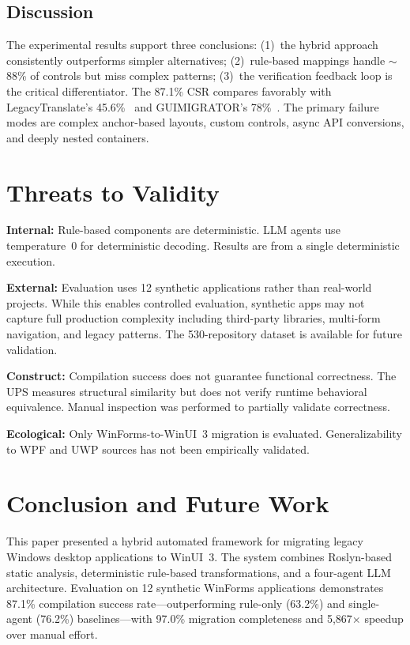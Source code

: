 \documentclass[conference]{IEEEtran}
\begin{document}
\subsection{Discussion}

The experimental results support three conclusions: (1)~the hybrid approach consistently outperforms simpler alternatives; (2)~rule-based mappings handle $\sim$88\% of controls but miss complex patterns; (3)~the verification feedback loop is the critical differentiator. The 87.1\% CSR compares favorably with LegacyTranslate's 45.6\%~\cite{moti2026} and GUIMIGRATOR's 78\%~\cite{gao2024}. The primary failure modes are complex anchor-based layouts, custom controls, async API conversions, and deeply nested containers.

\section{Threats to Validity}

\textbf{Internal:} Rule-based components are deterministic. LLM agents use temperature~0 for deterministic decoding. Results are from a single deterministic execution.

\textbf{External:} Evaluation uses 12 synthetic applications rather than real-world projects. While this enables controlled evaluation, synthetic apps may not capture full production complexity including third-party libraries, multi-form navigation, and legacy patterns. The 530-repository dataset is available for future validation.

\textbf{Construct:} Compilation success does not guarantee functional correctness. The UPS measures structural similarity but does not verify runtime behavioral equivalence. Manual inspection was performed to partially validate correctness.

\textbf{Ecological:} Only WinForms-to-WinUI~3 migration is evaluated. Generalizability to WPF and UWP sources has not been empirically validated.

\section{Conclusion and Future Work}

This paper presented a hybrid automated framework for migrating legacy Windows desktop applications to WinUI~3. The system combines Roslyn-based static analysis, deterministic rule-based transformations, and a four-agent LLM architecture. Evaluation on 12 synthetic WinForms applications demonstrates 87.1\% compilation success rate---outperforming rule-only (63.2\%) and single-agent (76.2\%) baselines---with 97.0\% migration completeness and 5,867$\times$ speedup over manual effort.
\end{document}
